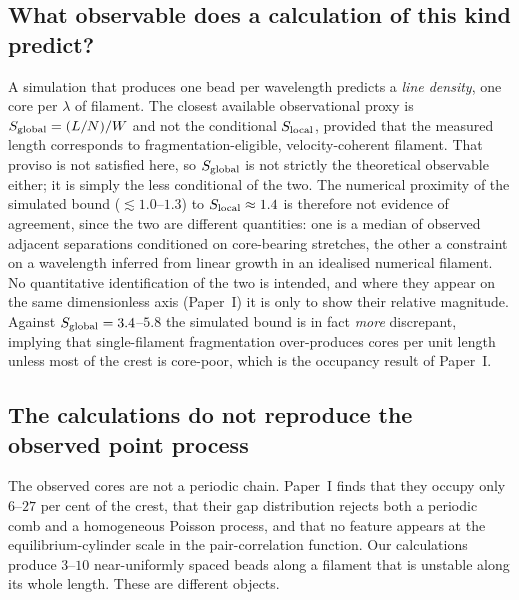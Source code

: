 \documentclass[usenatbib,twoside,twocolumn]{mnras}
\begin{document}
\subsection{What observable does a calculation of this kind predict?}


A simulation that produces one bead per wavelength predicts a \emph{line density}, one core per $\lambda$ of filament. The closest available observational proxy is $S_{\rm global}=(L/N)/W$ and not the conditional $S_{\rm local}$, provided that the measured length corresponds to fragmentation-eligible, velocity-coherent filament. That proviso is not satisfied here, so $S_{\rm global}$ is not strictly the theoretical observable either; it is simply the less conditional of the two. The numerical proximity of the simulated bound ($\lesssim1.0$--$1.3$) to $S_{\rm local}\approx1.4$ is therefore not evidence of agreement, since the two are different quantities: one is a median of observed adjacent separations conditioned on core-bearing stretches, the other a constraint on a wavelength inferred from linear growth in an idealised numerical filament. No quantitative identification of the two is intended, and where they appear on the same dimensionless axis (Paper~I) it is only to show their relative magnitude. Against $S_{\rm global}=3.4$--$5.8$ the simulated bound is in fact \emph{more} discrepant, implying that single-filament fragmentation over-produces cores per unit length unless most of the crest is core-poor, which is the occupancy result of Paper~I.


\subsection{The calculations do not reproduce the observed point process}

The observed cores are not a periodic chain. Paper~I finds that they occupy only $6$--$27$ per cent of the crest, that their gap distribution rejects both a periodic comb and a homogeneous Poisson process, and that no feature appears at the equilibrium-cylinder scale in the pair-correlation function. Our calculations produce $3$--$10$ near-uniformly spaced beads along a filament that is unstable along its whole length. These are different objects.
\end{document}

